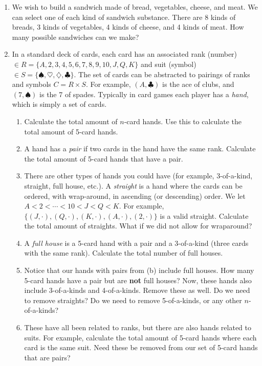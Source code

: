 \documentclass[main.tex]{subfiles}
\begin{document}
\begin{enumerate}
	\item We wish to build a sandwich made of bread, vegetables, cheese, and meat. We can select one of each kind of sandwich substance. There are 8 kinds of breads, 3 kinds of vegetables, 4 kinds of cheese, and 4 kinds of meat. How many possible sandwiches can we make?
	\item In a standard deck of cards, each card has an associated rank (number) \(\in R=\{A,2,3,4,5,6,7,8,9,10,J,Q,K\}\) and suit (symbol) \(\in S=\{\spadesuit,\heartsuit,\diamondsuit,\clubsuit\}\). The set of cards can be abstracted to pairings of ranks and symbols \(C = R \times S\). For example, \((A,\clubsuit)\) is the ace of clubs, and \((7,\spadesuit)\) is the 7 of spades. Typically in card games each player has a \textit{hand}, which is simply a set of cards.
	\begin{enumerate}
		\item Calculate the total amount of \(n\)-card hands. Use this to calculate the total amount of 5-card hands.
		\item A hand has a \textit{pair} if two cards in the hand have the same rank. Calculate the total amount of 5-card hands that have a pair.
		\item There are other types of hands you could have (for example, 3-of-a-kind, straight, full house, etc.). A \textit{straight} is a hand where the cards can be ordered, with wrap-around, in ascending (or descending) order. We let \(A < 2 < \cdots < 10 < J < Q < K\). For example, \(\{(J,\cdot), (Q,\cdot), (K,\cdot), (A,\cdot), (2,\cdot)\}\) is a valid straight. Calculate the total amount of straights. What if we did not allow for wraparound?
		\item A \textit{full house} is a 5-card hand with a pair and a 3-of-a-kind (three cards with the same rank). Calculate the total number of full houses.
		\item Notice that our hands with pairs from (b) include full houses. How many 5-card hands have a pair but are \textbf{not} full houses? Now, these hands also include 3-of-a-kinds and 4-of-a-kinds. Remove these as well. Do we need to remove straights? Do we need to remove 5-of-a-kinds, or any other \(n\)-of-a-kinds?
		\item These have all been related to ranks, but there are also hands related to suits. For example, calculate the total amount of 5-card hands where each card is the same suit. Need these be removed from our set of 5-card hands that are pairs?
	\end{enumerate}

\end{enumerate}
\end{document}
